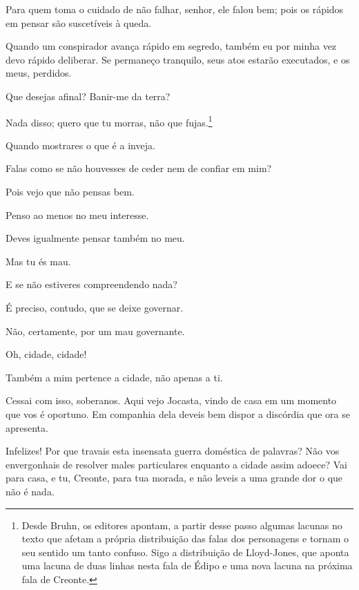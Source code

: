    Para quem toma o cuidado de não falhar, senhor, ele falou bem; pois os
rápidos em pensar são suscetíveis à queda.

   Quando um conspirador avança rápido em segredo, também eu por minha vez
 devo rápido deliberar. Se permaneço tranquilo, seus atos estarão
executados, e os meus, perdidos.

   Que desejas afinal? Banir-me da terra?

   Nada disso; quero que tu morras, não que fujas.\footnote{Desde Bruhn, os editores apontam, a partir desse
  passo algumas lacunas no texto que afetam a própria distribuição das
  falas dos personagens e tornam o seu sentido um tanto confuso. Sigo a
  distribuição de Lloyd-Jones, que aponta uma lacuna de duas linhas
  nesta fala de Édipo e uma nova lacuna na próxima fala de Creonte.}

   Quando mostrares o que é a inveja.

   Falas como se não houvesses de ceder nem de confiar em mim?

   Pois vejo que não pensas bem.

   Penso ao menos no meu interesse.

   Deves igualmente pensar também no meu.

   Mas tu és mau.

   E se não estiveres compreendendo nada?

   É preciso, contudo, que se deixe governar.

   Não, certamente, por um mau governante.

   Oh, cidade, cidade!

   Também a mim pertence a cidade, não apenas a ti.

   Cessai com isso, soberanos. Aqui vejo Jocasta, vindo de casa em um
momento que vos é oportuno. Em companhia dela deveis bem dispor a
discórdia que ora se apresenta.


   Infelizes! Por que travais esta insensata guerra doméstica de palavras?
Não vos envergonhais de resolver males particulares enquanto a cidade
assim adoece? Vai para casa, e tu, Creonte, para tua morada, e não
leveis a uma grande dor o que não é nada.

